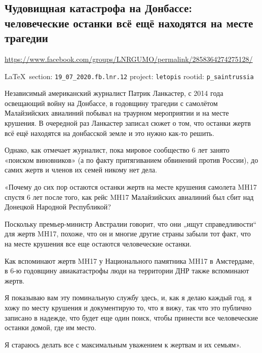  
 
  
\subsection{Чудовищная катастрофа на Донбассе: человеческие останки всё ещё находятся на месте трагедии}
\label{sec:19_07_2020.fb.lnr.12}
\url{https://www.facebook.com/groups/LNRGUMO/permalink/2858364274275128/}

\vspace{0.5cm}
{\small\LaTeX~section: \verb|19_07_2020.fb.lnr.12| project: \verb|letopis| rootid: \verb|p_saintrussia|}
\vspace{0.5cm}

Независимый американский журналист Патрик Ланкастер, с 2014 года освещающий
войну на Донбассе, в годовщину трагедии с самолётом Малайзийских авиалиний
побывал на траурном мероприятии и на месте крушения. В очередной раз Ланкастер
записал сюжет о том, что останки жертв всё ещё находятся на донбасской земле и
это нужно как-то решить.

Однако, как отмечает журналист, пока мировое сообщество 6 лет занято «поиском
виновников» (а по факту притягиванием обвинений против России), до самих жертв
и членов их семей никому нет дела.

«Почему до сих пор остаются останки жертв на месте крушения самолета MH17
спустя 6 лет после того, как рейс MH17 Малайзийских авиалиний был сбит над
Донецкой Народной Республикой?

Поскольку премьер-министр Австралии говорит, что они „ищут справедливости“ для
жертв MH17, похоже, что он и многие другие страны забыли тот факт, что на месте
крушения все еще остаются человеческие останки.

Как вспоминают жертв MH17 у Национального памятника MH17 в Амстердаме, в 6-ю
годовщину авиакатастрофы люди на территории ДНР также вспоминают жертв.

Я показываю вам эту поминальную службу здесь, и, как я делаю каждый год, я хожу
по месту крушения и документирую то, что я вижу, так что это публично записано
в надежде, что будет еще один поиск, чтобы принести все человеческие останки
домой, где им место.

Я стараюсь делать все с максимальным уважением к жертвам и их семьям».
  
